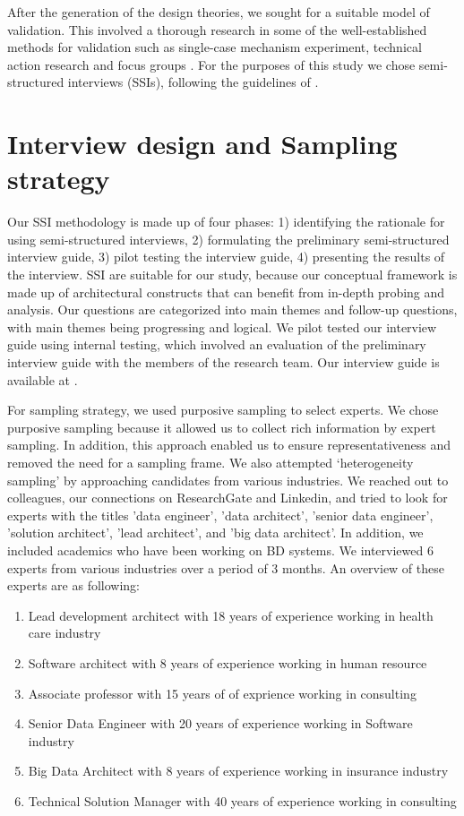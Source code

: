 \documentclass[a4paper,11pt,article,oneside]{memoir}
\begin{document}
After the generation of the design theories, we sought for a suitable model of validation. This involved a thorough research in some of the well-established methods for validation such as single-case mechanism experiment, technical action research and focus groups \cite{wieringa2014design}. For the purposes of this study we chose semi-structured interviews (SSIs), following the guidelines of \cite{kallio2016systematic}. 

\section{Interview design and Sampling strategy}
Our SSI methodology is made up of four phases: 1) identifying the rationale for using semi-structured interviews, 2) formulating the preliminary semi-structured interview guide, 3) pilot testing the interview guide, 4) presenting the results of the interview. SSI are suitable for our study, because our conceptual framework is made up of architectural constructs that can benefit from in-depth probing and analysis. Our questions are categorized into main themes and follow-up questions, with main themes being progressing and logical. We pilot tested our interview guide using internal testing, which involved an evaluation of the preliminary interview guide with the members of the research team. Our interview guide is available at \cite{interviewGuide}.

For sampling strategy, we used purposive sampling \citep{baltes2022sampling} to select experts. We chose purposive sampling because it allowed us to collect rich information by expert sampling. In addition, this approach enabled us to ensure representativeness and removed the need for a sampling frame. We also attempted `heterogeneity sampling' by approaching candidates from various industries. We reached out to colleagues, our connections on ResearchGate and Linkedin, and tried to look for experts with the titles 'data engineer', 'data architect', 'senior data engineer', 'solution architect', 'lead architect', and 'big data architect'. In addition, we included academics who have been working on BD systems. We interviewed 6 experts from various industries over a period of 3 months. An overview of these experts are as following:

\begin{enumerate}[label=\textbf{i-\arabic*}] 
    \item Lead development architect with 18 years of experience working in health care industry
    \item Software architect with 8 years of experience working in human resource
    \item Associate professor with 15 years of of exprience working in consulting
    \item Senior Data Engineer with 20 years of experience working in Software industry
    \item Big Data Architect with 8 years of experience working in insurance industry
    \item Technical Solution Manager with 40 years of experience working in consulting
\end{enumerate}
\end{document}
